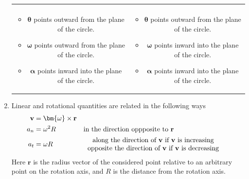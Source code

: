 \begin{enumerate}
\begin{table}[h]
    \centering
    \begin{tabular}{c  c}
        \begin{minipage}{.48\textwidth}
            
        \end{minipage}
        &
        \begin{minipage}{.48\textwidth}
            
        \end{minipage} \\
        \begin{minipage}{.48\textwidth}
            \begin{itemize}
                \item $\bm{\theta}$ points outward from the plane of the circle.
                \item $\bm{\omega}$ points outward from the plane of the circle.
                \item $\bm{\alpha}$ points inward into the plane of the circle.
            \end{itemize}
        \end{minipage}
        &
        \begin{minipage}{.48\textwidth}
            \begin{itemize}
                \item $\bm{\theta}$ points outward from the plane of the circle.
                \item $\bm{\omega}$ points inward into the plane of the circle.
                \item $\bm{\alpha}$ points inward into the plane of the circle.
            \end{itemize}
        \end{minipage}
    \end{tabular}
\end{table}

\item Linear and rotational quantities are related in the following ways
\begin{align}
\mathbf{v} &= \bm{\omega}\times\mathbf{r} \label{eq12}\\
a_n &= \omega^2R && \text{in the direction oppposite to $\mathbf{r}$} \label{eq13}\\
a_t &= {\omega}R && \text{\begin{tabular}{c}
along the direction of $\mathbf{v}$ if $\mathbf{v}$ is increasing\\
opposite the direction of $\mathbf{v}$ if $\mathbf{v}$ is decreasing
\end{tabular}} \label{eq14}
\end{align}
Here $\mathbf{r}$ is the radius vector of the considered point relative to an arbitrary point on the rotation axis, and $R$ is the distance from the rotation axis.

\end{enumerate}

